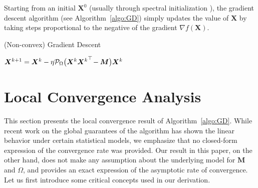 \documentclass{article}
\def\P{{\cal P}}
\newcommand{\hlnew}[1]{{#1}}
\newcommand{\norm}[1]{\|#1\|} %
\newcommand\numberthis{\addtocounter{equation}{1}\tag{\theequation}}
\DeclareMathOperator*{\vect}{vec}
\DeclareMathOperator*{\tr}{tr}
\newcommand{\topnew}{\top \hspace{-0.05cm}}
\begin{document}
Starting from an initial $\bm X^0$ (usually through spectral initialization \cite{ma2018implicit}), the \hlnew{gradient descent} algorithm (see Algorithm~\ref{algo:GD}) simply updates the value of $\bm X$ by taking steps proportional to the negative of the gradient $\nabla f(\bm X)$.


\begin{algorithm}[t]
\caption{(Non-convex) \hlnew{Gradient Descent}}
\label{algo:GD}
\begin{algorithmic}[1]
\Require{$\bm X^0$, $\P_\Omega(\bm M)$, $\eta$}
\State $\bm X^{k+1} = \bm X^k - \eta \P_\Omega \bigl(\bm X^k {\bm X^k}^\topnew - \bm M\bigr) \bm X^k$
\EndFor
\end{algorithmic}
\end{algorithm}













\section{Local Convergence Analysis}
\label{sec:result}

This section presents the local convergence result of Algorithm~\ref{algo:GD}. While recent work on the global guarantees of the algorithm has shown the linear behavior under certain statistical \hlnew{models}, we emphasize that no closed-form expression of the convergence rate was provided. Our result in this paper, on the other hand, does not make any assumption about the underlying model for $\bm M$ and $\Omega$, and \hlnew{provides} an exact expression of the asymptotic rate of convergence. Let us first introduce some critical concepts used in our derivation.
\end{document}
